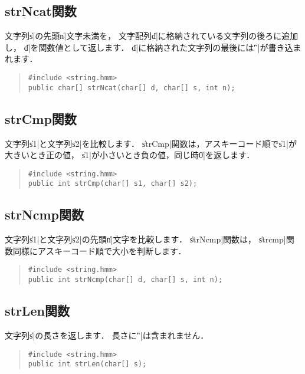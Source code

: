 \subsection{strNcat関数}

文字列\|s|の先頭\|n|文字未満を，
文字配列\|d|に格納されている文字列の後ろに追加し，
\|d|を関数値として返します．
\|d|に格納された文字列の最後には\|'\0'|が書き込まれます．

\begin{quote}
\begin{verbatim}
#include <string.hmm>
public char[] strNcat(char[] d, char[] s, int n);
\end{verbatim}
\end{quote}

\subsection{strCmp関数}

文字列\|s1|と文字列\|s2|を比較します．
\|strCmp|関数は，アスキーコード順で\|s1|が大きいとき正の値，
\|s1|が小さいとき負の値，同じ時\|0|を返します．

\begin{quote}
\begin{verbatim}
#include <string.hmm>
public int strCmp(char[] s1, char[] s2);
\end{verbatim}
\end{quote}

\subsection{strNcmp関数}

文字列\|s1|と文字列\|s2|の先頭\|n|文字を比較します．
\|strNcmp|関数は，
\|strcmp|関数同様にアスキーコード順で大小を判断します．

\begin{quote}
\begin{verbatim}
#include <string.hmm>
public int strNcmp(char[] d, char[] s, int n);
\end{verbatim}
\end{quote}

\subsection{strLen関数}

文字列\|s|の長さを返します．
長さに\|'\0'|は含まれません．

\begin{quote}
\begin{verbatim}
#include <string.hmm>
public int strLen(char[] s);
\end{verbatim}
\end{quote}

